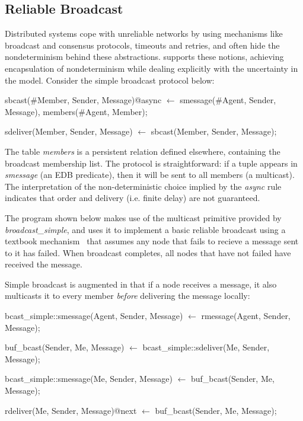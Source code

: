\subsection{Reliable Broadcast}
Distributed systems cope with unreliable networks by using mechanisms like broadcast and consensus protocols, 
timeouts and retries, and often hide the nondeterminism behind these abstractions.  \lang supports these notions,
achieving encapsulation of nondeterminism while dealing explicitly with the uncertainty in the model.  Consider the simple
broadcast protocol below:

\begin{Dedalus}
sbcast(#Member, Sender, Message)@async \(\leftarrow\)
    smessage(#Agent, Sender, Message),
    members(#Agent, Member);

sdeliver(Member, Sender, Message) \(\leftarrow\)
    sbcast(Member, Sender, Message);

\end{Dedalus}

The table \emph{members} is a persistent relation defined elsewhere, containing the broadcast 
membership list.  
The protocol is straightforward: if a tuple appears in \emph{smessage} (an EDB predicate), then
it will be sent to all members (a multicast).  The interpretation of the non-deterministic choice implied by the
\emph{async} rule indicates that order and delivery (i.e. finite delay) are not guaranteed.

The program shown below makes use of the
multicast primitive provided by \emph{broadcast\_simple}, and uses it
to implement a basic reliable broadcast using a textbook
mechanism~\cite{mullender} that assumes any node that fails to recieve
a message sent to it has failed.  When broadcast completes, all nodes
that have not failed have received the message.

Simple broadcast is augmented in that if a node receives a message, it 
also multicasts it to every member \emph{before} delivering the message locally:

\begin{Dedalus}

bcast_simple::smessage(Agent, Sender, Message)  \(\leftarrow\)
    rmessage(Agent, Sender, Message);

buf_bcast(Sender, Me, Message)  \(\leftarrow\)
    bcast_simple::sdeliver(Me, Sender, Message);

bcast_simple::smessage(Me, Sender, Message)  \(\leftarrow\)
    buf_bcast(Sender, Me, Message);

rdeliver(Me, Sender, Message)@next  \(\leftarrow\)
    buf_bcast(Sender, Me, Message);

\end{Dedalus}

